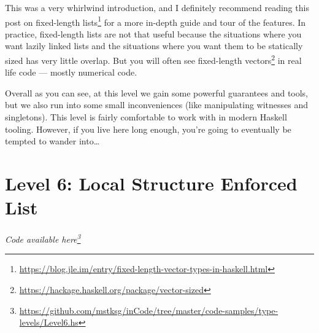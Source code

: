 \documentclass[]{article}
\newenvironment{Shaded}{}{}
\newcommand{\CommentTok}[1]{\textcolor[rgb]{0.38,0.63,0.69}{\textit{#1}}}
\newcommand{\DataTypeTok}[1]{\textcolor[rgb]{0.56,0.13,0.00}{#1}}
\newcommand{\KeywordTok}[1]{\textcolor[rgb]{0.00,0.44,0.13}{\textbf{#1}}}
\newcommand{\NormalTok}[1]{#1}
\newcommand{\OperatorTok}[1]{\textcolor[rgb]{0.40,0.40,0.40}{#1}}
\newcommand{\OtherTok}[1]{\textcolor[rgb]{0.00,0.44,0.13}{#1}}
\renewcommand{\href}[2]{#2\footnote{\url{#1}}}
\begin{document}
\begin{Shaded}
\end{Shaded}

This was a very whirlwind introduction, and I definitely recommend reading
\href{https://blog.jle.im/entry/fixed-length-vector-types-in-haskell.html}{this
post on fixed-length lists} for a more in-depth guide and tour of the features.
In practice, fixed-length lists are not that useful because the situations where
you want lazily linked lists and the situations where you want them to be
statically sized has very little overlap. But you will often see
\href{https://hackage.haskell.org/package/vector-sized}{fixed-length vectors} in
real life code --- mostly numerical code.

Overall as you can see, at this level we gain some powerful guarantees and
tools, but we also run into some small inconveniences (like manipulating
witnesses and singletons). This level is fairly comfortable to work with in
modern Haskell tooling. However, if you live here long enough, you're going to
eventually be tempted to wander into\ldots{}

\section{Level 6: Local Structure Enforced
List}\label{level-6-local-structure-enforced-list}

\emph{\href{https://github.com/mstksg/inCode/tree/master/code-samples/type-levels/Level6.hs}{Code
available here}}
\end{document}
